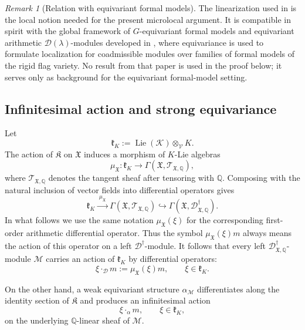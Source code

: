 \documentclass[11pt]{amsart}
\theoremstyle{plain}
\theoremstyle{definition}
\theoremstyle{remark}
\newtheorem{remark}{Remark}[section]
\begin{document}
\begin{remark}[Relation with equivariant formal models]
\label{rem:section3-rendiconti}
The linearization used in  is the local
notion needed for the present microlocal argument.  It is compatible in spirit
with the global framework of \(G\)-equivariant formal models and equivariant
arithmetic \(\mathcal D(\lambda)\)-modules developed in
\cite{SarrazolaRendiconti}, where equivariance is used to formulate
localization for coadmissible modules over families of formal models of the
rigid flag variety.  No result from that paper is used in the proof below; it
serves only as background for the equivariant formal-model setting.
\end{remark}

\subsection{Infinitesimal action and strong equivariance}

Let
\[
  \mathfrak k_K:=\operatorname{Lie}(\mathcal K)\otimes_{\mathcal V}K.
\]
The action of \(\mathfrak K\) on \(\mathfrak X\) induces a morphism of
\(K\)-Lie algebras
\[
  \mu_{\mathfrak X}:\mathfrak k_K
  \longrightarrow
  \Gamma(\mathfrak X,\mathscr T_{\mathfrak X,\mathbb Q}),
\]
where \(\mathscr T_{\mathfrak X,\mathbb Q}\) denotes the tangent sheaf after
tensoring with \(\mathbb Q\). Composing with the natural inclusion of vector
fields into differential operators gives
\[
  \mathfrak k_K
  \xrightarrow{\;\mu_{\mathfrak X}\;}
  \Gamma(\mathfrak X,\mathscr T_{\mathfrak X,\mathbb Q})
  \hookrightarrow
  \Gamma(\mathfrak X,\mathscr D^\dagger_{\mathfrak X,\mathbb Q}).
\]
In what follows we use the same notation \(\mu_{\mathfrak X}(\xi)\) for the
corresponding first-order arithmetic differential operator. Thus the symbol
\(\mu_{\mathfrak X}(\xi)m\) always means the action of this operator on a
left \(\mathscr D^\dagger\)-module.
It follows that every left \(\mathscr D^\dagger_{\mathfrak X,\mathbb Q}\)-module
\(\mathcal M\) carries an action of \(\mathfrak k_K\) by differential operators:
\[
  \xi\cdot_{\mathscr D}m:=\mu_{\mathfrak X}(\xi)m,
  \qquad
  \xi\in\mathfrak k_K.
\]

On the other hand, a weak equivariant structure \(\alpha_{\mathcal M}\)
differentiates along the identity section of \(\mathfrak K\) and produces an
infinitesimal action
\[
  \xi\cdot_{\alpha}m,
  \qquad
  \xi\in\mathfrak k_K,
\]
on the underlying \(\mathbb Q\)-linear sheaf of \(\mathcal M\).
\end{document}
